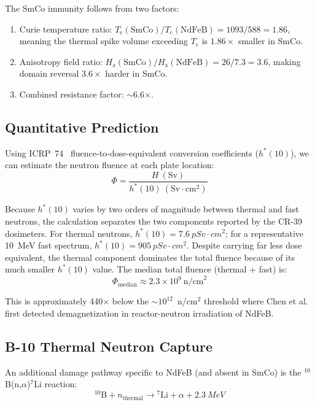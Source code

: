 \documentclass[11pt,letterpaper]{article}
\newcommand{\ndfeb}{NdFeB}
\newcommand{\smco}{SmCo}
\newcommand{\Tc}{T_\mathrm{c}}
\newcommand{\Ha}{H_\mathrm{a}}
\begin{document}
The \smco{} immunity follows from two factors:
\begin{enumerate}
    \item Curie temperature ratio: $\Tc(\mathrm{SmCo})/\Tc(\mathrm{NdFeB}) =
    1093/588 = 1.86$, meaning the thermal spike volume exceeding $\Tc$ is
    $1.86\times$ smaller in \smco{}.
    \item Anisotropy field ratio: $\Ha(\mathrm{SmCo})/\Ha(\mathrm{NdFeB}) =
    26/7.3 = 3.6$, making domain reversal $3.6\times$ harder in \smco{}.
    \item Combined resistance factor: $\sim$6.6$\times$.
\end{enumerate}

\subsection{Quantitative Prediction}
\label{sec:quantitative_prediction}

Using ICRP~74~\cite{ICRP74} fluence-to-dose-equivalent conversion coefficients
($h^*(10)$), we can estimate the neutron fluence at each plate location:
\begin{equation}
    \Phi = \frac{H~(\mathrm{Sv})}{h^*(10)~(\mathrm{Sv} \cdot \mathrm{cm}^2)}
\end{equation}

Because $h^*(10)$ varies by two orders of magnitude between thermal and fast
neutrons, the calculation separates the two components reported by the CR-39
dosimeters. For thermal neutrons, $h^*(10) = \SI{7.6}{pSv \cdot cm^2}$; for
a representative \SI{10}{MeV} fast spectrum, $h^*(10) = \SI{905}{pSv \cdot
cm^2}$. Despite carrying far less dose equivalent, the thermal component
dominates the total fluence because of its much smaller $h^*(10)$ value. The
median total fluence (thermal + fast) is:
\begin{equation*}
    \Phi_\mathrm{median} \approx 2.3 \times 10^9~\mathrm{n/cm}^2
\end{equation*}

This is approximately 440$\times$ below the $\sim$$10^{12}$~n/cm$^2$
threshold where Chen et al.~\cite{Chen2014} first detected demagnetization in
reactor-neutron irradiation of \ndfeb{}.

\subsection{B-10 Thermal Neutron Capture}

An additional damage pathway specific to \ndfeb{} (and absent in \smco{}) is
the ${}^{10}$B(n,$\alpha$)${}^{7}$Li reaction:
\begin{equation*}
    {}^{10}\mathrm{B} + n_\mathrm{thermal} \to {}^{7}\mathrm{Li} + \alpha
    + \SI{2.3}{MeV}
\end{equation*}
\end{document}
